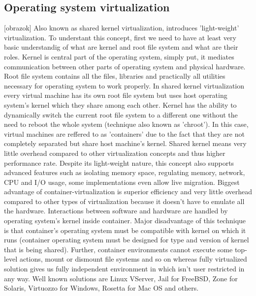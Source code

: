 \begin{enumerate}
\subsection{Operating system virtualization}
[obrazok] Also known as shared kernel virtualization, introduces 'light-weight' virtualization. To understant this concept, first we need to have at least very basic understandig of what are kernel and root file system and what are their roles. Kernel is central part of the operating system, simply put, it mediates communication between other parts of operating system and physical hardware. Root file system contains all the files, libraries and practically all utilities necessary for operating system to work properly. In shared kernel virtualization every virtual machine has its own root file system but uses host operating system's kernel which they share among each other. Kernel has the ability to dynamically switch the current root file system to a different one without the need to reboot the whole system (technique also known as 'chroot'). In this case, virtual machines are reffered to as 'containers' due to the fact that they are not completely separated but share host machine's kernel. Shared kernel means very little overhead compared to other virtualization concepts and thus higher performance rate. Despite its light-weight nature, this concept also supports advanced features such as isolating memory space, regulating memory, network, CPU and I/O usage, some implementations even allow live migration. Biggest advantage of container-virtualization is superior efficiency and very little overhead compared to other types of virtualization because it doesn't have to emulate all the hardware. Interactions between software and hardware are handled by operating system's kernel inside container. Major disadvantage of this technique is that container's operating system must be compatible with kernel on which it runs (container operating system must be designed for type and version of kernel that is being shared). Further, container environments cannot execute some top-level actions, mount or dismount file systems and so on whereas fully virtualized solution gives us fully independent environment in which isn't user restricted in any way.
Well known solutions are Linux VServer, Jail for FreeBSD, Zone for Solaris, Virtuozzo for Windows, Rosetta for Mac OS and others.


\end{enumerate}
